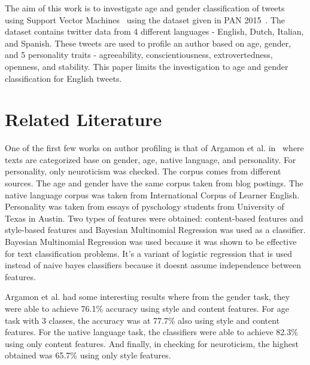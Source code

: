 \documentclass[a4paper]{llncs}
\begin{document}
The aim of this work is to investigate age and gender classification of tweets using Support Vector Machines~\cite{cortes1995support} using the dataset given in PAN 2015~\cite{rangel:2015}. The dataset contains twitter data from 4 different languages - English, Dutch, Italian, and Spanish. These tweets are used to profile an author based on age, gender, and 5 personality traits - agreeability, conscientiousness, extrovertedness, openness, and stability. This paper limits the investigation to age and gender classification for English tweets.   

 


\section{Related Literature}
One of the first few works on author profiling is that of Argamon et al. in~\cite{argamon2009automatically} where texts are categorized base on gender, age, native language, and personality. For personality, only neuroticism was checked. The corpus comes from different sources. The age and gender have the same corpus taken from blog postings. The native language corpus was taken from International Corpus of Learner English. Personality was taken from essays of pyschology students from University of Texas in Austin. Two types of features were obtained: content-based features and style-based features and Bayesian Multinomial Regression was used as a classifier. Bayesian Multinomial Regression was used because it was shown to be effective for text classification problems. It's a variant of logistic regression that is used instead of naive bayes classifiers because it doesnt assume independence between features.

Argamon et al. had some interesting results where from the gender task, they were able to achieve 76.1\% accuracy using style and content features. For age task with 3 classes, the accuracy was at 77.7\% also using style and content features. For the native language task, the classifiers were able to achieve 82.3\% using only content features. And finally, in checking for neuroticism, the highest obtained was 65.7\% using only style features. 
\end{document}
